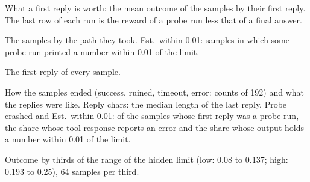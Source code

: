 \documentclass[11pt,a4paper]{article}
\begin{document}
\begin{table}[h]
\centering\small
\resizebox{\linewidth}{!}{}
\caption{What a first reply is worth: the mean outcome of the samples by
their first reply. The last row of each run is the reward of a probe run
less that of a final answer.}
\label{tab:value}
\end{table}

\begin{table}[h]
\centering\small
\resizebox{\linewidth}{!}{}
\caption{The samples by the path they took. Est.\ within 0.01: samples in
which some probe run printed a number within 0.01 of the limit.}
\label{tab:path}
\end{table}

\begin{table}[h]
\centering\small
\resizebox{\linewidth}{!}{}
\caption{The first reply of every sample.}
\label{tab:first}
\end{table}

\begin{table}[h]
\centering\small
\resizebox{\linewidth}{!}{}
\caption{How the samples ended (success, ruined, timeout, error: counts of
192) and what the replies were like. Reply chars: the median length of the
last reply. Probe crashed and Est.\ within 0.01: of the samples whose first
reply was a probe run, the share whose tool response reports an error and
the share whose output holds a number within 0.01 of the limit.}
\label{tab:diag}
\end{table}

\begin{table}[h]
\centering\small
\resizebox{0.92\linewidth}{!}{}

\medskip
\resizebox{0.92\linewidth}{!}{}
\caption{Outcome by thirds of the range of the hidden limit (low: 0.08 to
0.137; high: 0.193 to 0.25), 64 samples per third.}
\label{tab:third}
\end{table}
\end{document}
